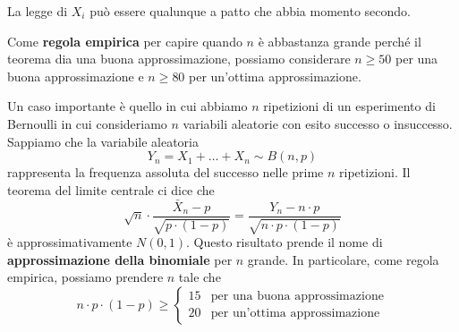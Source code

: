 \begin{observation}
	La legge di $X_i$ può essere qualunque a patto che abbia momento secondo.
\end{observation}

Come \textbf{regola empirica} per capire quando $n$ è abbastanza grande perché il teorema dia
una buona approssimazione, possiamo considerare $n \geq 50$ per una buona approssimazione e
$n \geq 80$ per un'ottima approssimazione.

Un caso importante è quello in cui abbiamo $n$ ripetizioni di un esperimento di Bernoulli in cui
consideriamo $n$ variabili aleatorie con esito successo o insuccesso. Sappiamo che la variabile
aleatoria
\[ Y_n = X_1 + \dots + X_n \sim B(n, p) \]
rappresenta la frequenza assoluta del successo nelle prime $n$ ripetizioni. Il teorema del limite
centrale ci dice che
\[
	\sqrt{n} \cdot \frac{\bar{X}_n - p}{\sqrt{p \cdot (1-p)}} =
	\frac{Y_n - n \cdot p}{\sqrt{n \cdot p \cdot (1-p)}}
\]
è approssimativamente $N(0,1)$. Questo risultato prende il nome di
\textbf{approssimazione della binomiale} per $n$ grande. In particolare, come regola empirica,
possiamo prendere $n$ tale che
\[
	n \cdot p \cdot (1 - p) \geq \begin{cases}
		15 & \text{per una buona approssimazione} \\
		20 & \text{per un'ottima approssimazione}
	\end{cases}
\]

